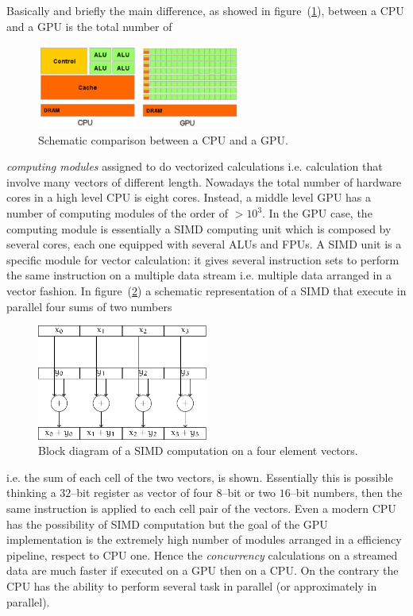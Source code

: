 Basically and briefly the main difference, as showed in figure~(\ref{fig:GPUvsCPU}), between a CPU and a GPU is 
the total number of 
\begin{figure}[h!t]
	\centering
	\includegraphics[width=0.6\textwidth]{./img/GPUvsCPU}
	\caption{Schematic comparison between a CPU and a GPU.}
	\label{fig:GPUvsCPU}
\end{figure}
\textit{computing modules} assigned to do vectorized calculations i.e. calculation that involve many vectors of 
different length. Nowadays the total number of hardware cores in a high level CPU is eight cores. Instead, a 
middle level GPU has a number of computing modules of the order of $ > 10^3$. In the GPU case, the computing 
module is essentially a \ac{SIMD} computing unit which is composed by several cores, each one equipped with 
several \acp{ALU} and \acp{FPU}. A \ac{SIMD} unit is a specific module for vector calculation: it gives several 
instruction sets to perform the same instruction on a multiple data stream i.e. multiple data arranged in a 
vector fashion. In figure~(\ref{fig:simd}) a schematic representation of a \ac{SIMD} that execute in parallel 
four sums of two numbers
\begin{figure}[h!t]
	\centering
	\includegraphics[width=0.5\textwidth]{./img//simd/simd.pdf}
	\caption{Block diagram of a \acs{SIMD} computation on a four element vectors.}
	\label{fig:simd}
\end{figure}
i.e. the sum of each cell of the two vectors, is shown. Essentially this is possible thinking a $32$--bit register as vector of four $8$--bit or two $16$--bit numbers, then the same instruction is applied to each cell pair of the vectors. Even a modern CPU has the possibility of \ac{SIMD} computation but the goal of the GPU implementation is the extremely high number of modules arranged in a efficiency pipeline, respect to CPU one. Hence the \textit{concurrency} calculations on a streamed data are much faster if executed on a GPU then on a CPU. On the contrary the CPU has the ability to perform several task in parallel (or approximately in parallel).

